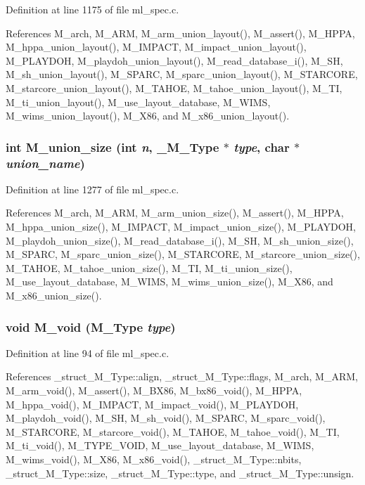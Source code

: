 Definition at line 1175 of file ml\_\-spec.c.

References M\_\-arch, M\_\-ARM, M\_\-arm\_\-union\_\-layout(), M\_\-assert(), M\_\-HPPA, M\_\-hppa\_\-union\_\-layout(), M\_\-IMPACT, M\_\-impact\_\-union\_\-layout(), M\_\-PLAYDOH, M\_\-playdoh\_\-union\_\-layout(), M\_\-read\_\-database\_\-i(), M\_\-SH, M\_\-sh\_\-union\_\-layout(), M\_\-SPARC, M\_\-sparc\_\-union\_\-layout(), M\_\-STARCORE, M\_\-starcore\_\-union\_\-layout(), M\_\-TAHOE, M\_\-tahoe\_\-union\_\-layout(), M\_\-TI, M\_\-ti\_\-union\_\-layout(), M\_\-use\_\-layout\_\-database, M\_\-WIMS, M\_\-wims\_\-union\_\-layout(), M\_\-X86, and M\_\-x86\_\-union\_\-layout().
\subsubsection{\setlength{\rightskip}{0pt plus 5cm}int M\_\-union\_\-size (int {\em n}, \bf{\_\-M\_\-Type} $\ast$ {\em type}, char $\ast$ {\em union\_\-name})}\label{m__spec_8h_9afb7743715935be6c9dcd628a03408b}




Definition at line 1277 of file ml\_\-spec.c.

References M\_\-arch, M\_\-ARM, M\_\-arm\_\-union\_\-size(), M\_\-assert(), M\_\-HPPA, M\_\-hppa\_\-union\_\-size(), M\_\-IMPACT, M\_\-impact\_\-union\_\-size(), M\_\-PLAYDOH, M\_\-playdoh\_\-union\_\-size(), M\_\-read\_\-database\_\-i(), M\_\-SH, M\_\-sh\_\-union\_\-size(), M\_\-SPARC, M\_\-sparc\_\-union\_\-size(), M\_\-STARCORE, M\_\-starcore\_\-union\_\-size(), M\_\-TAHOE, M\_\-tahoe\_\-union\_\-size(), M\_\-TI, M\_\-ti\_\-union\_\-size(), M\_\-use\_\-layout\_\-database, M\_\-WIMS, M\_\-wims\_\-union\_\-size(), M\_\-X86, and M\_\-x86\_\-union\_\-size().
\subsubsection{\setlength{\rightskip}{0pt plus 5cm}void M\_\-void (\bf{M\_\-Type} {\em type})}\label{m__spec_8h_194c266d106dcf3ee22ed66fb67b4b06}




Definition at line 94 of file ml\_\-spec.c.

References \_\-struct\_\-M\_\-Type::align, \_\-struct\_\-M\_\-Type::flags, M\_\-arch, M\_\-ARM, M\_\-arm\_\-void(), M\_\-assert(), M\_\-BX86, M\_\-bx86\_\-void(), M\_\-HPPA, M\_\-hppa\_\-void(), M\_\-IMPACT, M\_\-impact\_\-void(), M\_\-PLAYDOH, M\_\-playdoh\_\-void(), M\_\-SH, M\_\-sh\_\-void(), M\_\-SPARC, M\_\-sparc\_\-void(), M\_\-STARCORE, M\_\-starcore\_\-void(), M\_\-TAHOE, M\_\-tahoe\_\-void(), M\_\-TI, M\_\-ti\_\-void(), M\_\-TYPE\_\-VOID, M\_\-use\_\-layout\_\-database, M\_\-WIMS, M\_\-wims\_\-void(), M\_\-X86, M\_\-x86\_\-void(), \_\-struct\_\-M\_\-Type::nbits, \_\-struct\_\-M\_\-Type::size, \_\-struct\_\-M\_\-Type::type, and \_\-struct\_\-M\_\-Type::unsign.

